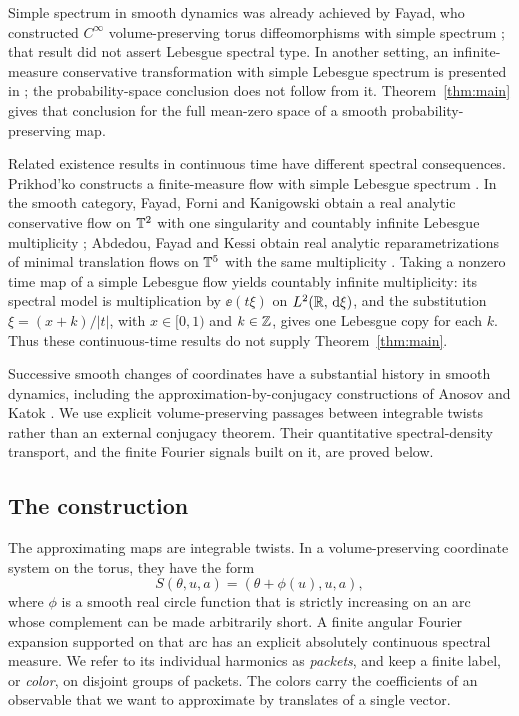 Simple spectrum in smooth dynamics was already achieved by Fayad, who
constructed $C^\infty$ volume-preserving torus diffeomorphisms with
simple spectrum \cite{Fayad2001}; that result did not assert Lebesgue
spectral type.
In another setting, an infinite-measure conservative transformation
with simple Lebesgue spectrum is presented in
\cite[Theorem~2.2]{ElAbdalaoui2023}; the probability-space conclusion
does not follow from it. Theorem~\ref{thm:main} gives that conclusion
for the full mean-zero space of a smooth probability-preserving map.

Related existence results in continuous time have different spectral
consequences. Prikhod'ko constructs a finite-measure flow with simple
Lebesgue spectrum \cite[Theorem~3]{Prikhodko2020}. In the smooth category,
Fayad, Forni and Kanigowski obtain a real analytic conservative flow on
$\mathbb T^2$ with one singularity and countably infinite Lebesgue multiplicity
\cite[Theorem~1]{FFK2021}; Abdedou, Fayad and Kessi obtain real analytic
reparametrizations of minimal translation flows on $\mathbb T^5$ with the same
multiplicity \cite[Theorem~1.1]{AFK2023}. Taking a nonzero time map of a
simple Lebesgue flow yields countably infinite multiplicity: its spectral
model is multiplication by $\ee(t\xi)$ on $L^2(\mathbb R,\,\mathrm d\xi)$, and the
substitution $\xi=(x+k)/|t|$, with $x\in[0,1)$ and $k\in\mathbb Z$, gives one
Lebesgue copy for each $k$. Thus these continuous-time results do not
supply Theorem~\ref{thm:main}.

Successive smooth changes of coordinates have a substantial history in
smooth dynamics, including the approximation-by-conjugacy constructions
of Anosov and Katok \cite{AnosovKatok1970}. We use explicit
volume-preserving passages between integrable twists rather than an
external conjugacy theorem. Their quantitative spectral-density
transport, and the finite Fourier signals built on it, are proved below.

\subsection*{The construction}
The approximating maps are integrable twists. In a volume-preserving
coordinate system on the torus, they have the form
\[
 S(\theta,u,a)=(\theta+\phi(u),u,a),
\]
where $\phi$ is a smooth real circle function that is strictly increasing
on an arc whose complement can be made arbitrarily short. A finite angular
Fourier expansion supported on that arc has an explicit absolutely
continuous spectral measure. We refer to its individual harmonics as
\emph{packets}, and keep a finite label, or \emph{color}, on disjoint groups
of packets. The colors carry the coefficients of an observable that we
want to approximate by translates of a single vector.

